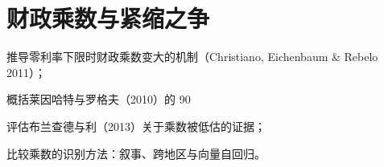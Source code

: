 \chapter{财政乘数与紧缩之争}\label{ch:multipliers}

\begin{chapterguide}
\begin{guidegoals}
\item 推导零利率下限时财政乘数变大的机制（Christiano, Eichenbaum \& Rebelo 2011）；
\item 概括莱因哈特与罗格夫（2010）的 90%
\item 评估布兰查德与利（2013）关于乘数被低估的证据；
\item 比较乘数的识别方法：叙事、跨地区与向量自回归。
\end{guidegoals}
\end{chapterguide}

\chapterstub
